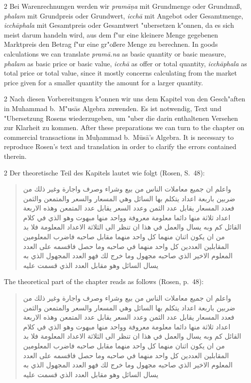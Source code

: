 \documentclass[10pt,a4paper]{article}
\renewcommand{\switchcolumn}{\syncronize\nointerlineskip\columnbreak}
\newcommand{\RL}[1]{\beginR#1\endR}
\newcommand{\ar}[1]{{\arabicfont\RL{#1}}}
\begin{document}
\begin{paracol}{2}
Bei Warenrechnungen werden wir \textit{pram\=a\d{n}a} mit Grundmenge oder Grundma\ss{}, \textit{phalam} mit Grundpreis oder Grundwert, \textit{icch\=a} mit Angebot oder Gesamtmenge, \textit{icch\=aphala} mit Gesamtpreis oder Gesamtwert "ubersetzen k"onnen, da es sich meist darum handeln wird, aus dem f"ur eine kleinere Menge gegebenen Marktpreis den Betrag f"ur eine gr"o\ss{}ere Menge zu berechnen.
\switchcolumn
In goods calculations we can translate \textit{pram\=a.na} as basic quantity or basic measure, \textit{phalam} as basic price or basic value, \textit{icch\=a} as offer or total quantity, \textit{icch\=aphala} as total price or total value, since it mostly concerns calculating from the market price given for a smaller quantity the amount for a larger quantity.
\end{paracol}

\begin{paracol}{2}
Nach diesen Vorbereitungen k"onnen wir uns dem Kapitel von den Gesch"aften in Muhammad b.\ M"us\=as Algebra zuwenden. Es ist notwendig, Text und "Ubersetzung Rosens wiederzugeben, um "uber die darin enthaltenen Versehen zur Klarheit zu kommen.
\switchcolumn
After these preparations we can turn to the chapter on commercial transactions in Mu\d{h}ammad b.\ M\=us\=a's Algebra. It is necessary to reproduce Rosen's text and translation in order to clarify the errors contained therein.
\end{paracol}

\begin{paracol}{2}
Der theoretische Teil des Kapitels lautet wie folgt (Rosen, S.\ 48):

\begin{quote}
\ar{واعلم ان جميع معاملات الناس من بيع وشراء وصرف واجارة وغير ذلك من ضربين باربعة اعداد يتكلم بها السائل وهي المسعار والسعر والمتمعن والثمن فعدد المسعار يقابل عدد الثمن وعدد السعر يقابل عدد المتمعن وهذه الاربعة اعداد ثلاثة منها دائما معلومة معروفة وواحد منها مبهوت وهو الذي في كلام القائل كم وبه يسال والعمل في هذا ان تنظر الى الثلاثة الاعداد المعلومة فلا بد من ان يكون اثنان منهما كل واحد منهما مقابل صاحبه فاضرب المعلومين المقابلين العددين كل واحد منهما في صاحبه وما حصل فاقسمه على العدد المعلوم الاخير الذي صاحبه مجهول وما خرج لك فهو العدد المجهول الذي به يسال السائل وهو مقابل العدد الذي قسمت عليه}
\end{quote}
\switchcolumn
The theoretical part of the chapter reads as follows (Rosen, p.\ 48):

\begin{quote}
\ar{واعلم ان جميع معاملات الناس من بيع وشراء وصرف واجارة وغير ذلك من ضربين باربعة اعداد يتكلم بها السائل وهي المسعار والسعر والمتمعن والثمن فعدد المسعار يقابل عدد الثمن وعدد السعر يقابل عدد المتمعن وهذه الاربعة اعداد ثلاثة منها دائما معلومة معروفة وواحد منها مبهوت وهو الذي في كلام القائل كم وبه يسال والعمل في هذا ان تنظر الى الثلاثة الاعداد المعلومة فلا بد من ان يكون اثنان منهما كل واحد منهما مقابل صاحبه فاضرب المعلومين المقابلين العددين كل واحد منهما في صاحبه وما حصل فاقسمه على العدد المعلوم الاخير الذي صاحبه مجهول وما خرج لك فهو العدد المجهول الذي به يسال السائل وهو مقابل العدد الذي قسمت عليه}
\end{quote}
\end{paracol}
\end{document}
